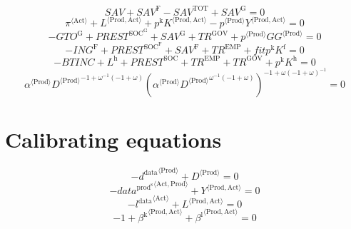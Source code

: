 \begin{equation}
{S\!A\!V} + {S\!A\!V}^{\mathrm{F}} - {S\!A\!V}^{\mathrm{TOT}} + {S\!A\!V}^{\mathrm{G}} = 0
\end{equation}
\begin{equation}
{\pi}^{\langle \mathrm{Act}\rangle} + {L}^{\langle \mathrm{Prod},\mathrm{Act}\rangle} + {p^{\mathrm{k}}} {{K}^{\langle \mathrm{Prod},\mathrm{Act}\rangle}} - {{p}^{\langle \mathrm{Prod}\rangle}} {{Y}^{\langle \mathrm{Prod},\mathrm{Act}\rangle}} = 0
\end{equation}
\begin{equation}
-{G\!T\!O}^{\mathrm{G}} + {P\!R\!E\!S\!T}^{\mathrm{SOC}^{\mathrm{G}}} + {S\!A\!V}^{\mathrm{G}} + {T\!R}^{\mathrm{GOV}} + {{p}^{\langle \mathrm{Prod}\rangle}} {{{G\!G}}^{\langle \mathrm{Prod}\rangle}} = 0
\end{equation}
\begin{equation}
-{I\!N\!G}^{\mathrm{F}} + {P\!R\!E\!S\!T}^{\mathrm{SOC}^{\mathrm{F}}} + {S\!A\!V}^{\mathrm{F}} + {T\!R}^{\mathrm{EMP}} + {{f\!i\!t}} {p^{\mathrm{k}}} {K^{\mathrm{f}}} = 0
\end{equation}
\begin{equation}
-{B\!T\!I\!N\!C} + L^{\mathrm{h}} + {P\!R\!E\!S\!T}^{\mathrm{SOC}} + {T\!R}^{\mathrm{EMP}} + {T\!R}^{\mathrm{GOV}} + {p^{\mathrm{k}}} {K^{\mathrm{h}}} = 0
\end{equation}
\begin{equation}
{{\alpha}^{\langle \mathrm{\mathrm{Prod}}\rangle}} {{{D}^{\langle \mathrm{Prod}\rangle}}^{-1 + {\omega}^{-1} \left(-1 + \omega\right)}} {\left({{\alpha}^{\langle \mathrm{\mathrm{Prod}}\rangle}} {{{D}^{\langle \mathrm{Prod}\rangle}}^{{\omega}^{-1} \left(-1 + \omega\right)}}\right)^{-1 + {\omega} \left(-1 + \omega\right)^{-1}}} = 0
\end{equation}



\section{Calibrating equations}

\begin{equation}
-{d^{\mathrm{data}}}^{\langle \mathrm{\mathrm{Prod}}\rangle} + {D}^{\langle \mathrm{Prod}\rangle} = 0
\end{equation}
\begin{equation}
-{{d\!a\!t\!a}^{\mathrm{prod}^{\mathrm{s}}}}^{\langle \mathrm{\mathrm{Act}},\mathrm{\mathrm{Prod}}\rangle} + {Y}^{\langle \mathrm{Prod},\mathrm{Act}\rangle} = 0
\end{equation}
\begin{equation}
-{l^{\mathrm{data}}}^{\langle \mathrm{\mathrm{Act}}\rangle} + {L}^{\langle \mathrm{Prod},\mathrm{Act}\rangle} = 0
\end{equation}
\begin{equation}
-1 + {\beta^{\mathrm{k}}}^{\langle \mathrm{\mathrm{Prod}},\mathrm{\mathrm{Act}}\rangle} + {\beta^{\mathrm{l}}}^{\langle \mathrm{\mathrm{Prod}},\mathrm{\mathrm{Act}}\rangle} = 0
\end{equation}





